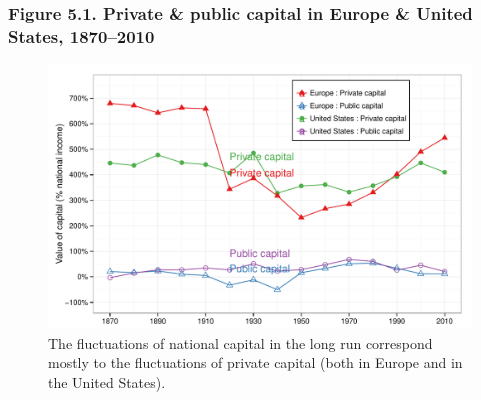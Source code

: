 \documentclass[t]{beamer}\usepackage[]{graphicx}\usepackage[]{color}
\newenvironment{knitrout}{}{} %
\begin{document}
\begin{frame}[label=Figure_5_1]
\frametitle{Figure 5.1. Private \& public capital in Europe \& United States, 1870--2010}
\begin{figure}[t]
\begin{minipage}[b]{\textwidth}
\centering
\begin{knitrout}\footnotesize
{}\color{fgcolor}

{\centering \includegraphics[width=1\linewidth]{figures/color/Figure_5_1} 

}



\end{knitrout}
\caption{The fluctuations of national capital in the long run correspond mostly to the fluctuations of private capital (both in Europe and in the United States).}
\end{minipage}
\end{figure}
\end{frame}
\end{document}
